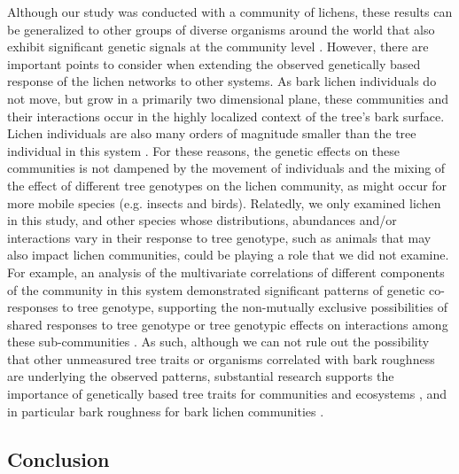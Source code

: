 \documentclass[fleqn,12pt]{olplainarticle}
\begin{document}
Although our study was conducted with a community of lichens, these
results can be generalized to other groups of diverse organisms around
the world that also exhibit significant genetic signals at the
community level \cite{Rowntree2011, Whitham2012}. However, there are
important points to consider when extending the observed genetically
based response of the lichen networks to other systems. As bark lichen
individuals do not move, but grow in a primarily two dimensional
plane, these communities and their interactions occur in the highly
localized context of the tree's bark surface. Lichen individuals are
also many orders of magnitude smaller than the tree individual in this
system \cite{Lamit2011}. For these reasons, the genetic effects on
these communities is not dampened by the movement of individuals and
the mixing of the effect of different tree genotypes on the lichen
community, as might occur for more mobile species (e.g. insects and
birds). Relatedly, we only examined lichen in this study, and other
species whose distributions, abundances and/or interactions vary in
their response to tree genotype, such as animals that may also impact
lichen communities, could be playing a role that we did not
examine. For example, an analysis of the multivariate correlations of
different components of the community in this system demonstrated
significant patterns of genetic co-responses to tree genotype,
supporting the non-mutually exclusive possibilities of shared
responses to tree genotype or tree genotypic effects on interactions
among these sub-communities \cite{Lamit2015c}. As such, although we
can not rule out the possibility that other unmeasured tree traits or
organisms correlated with bark roughness are underlying the observed
patterns, substantial research supports the importance of genetically
based tree traits for communities and ecosystems
\cite{DesRoches2018TheVariation}, and in particular bark roughness for
bark lichen communities \cite{Bdeir2017, Lamit2011, Lamit2015a}.




\subsection*{Conclusion}
\end{document}
